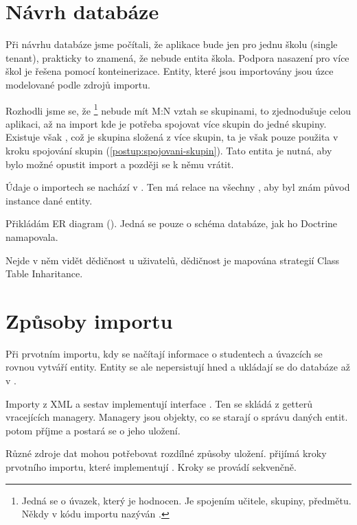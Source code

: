 \section{Návrh databáze}

Při návrhu databáze jsme počítali, že aplikace bude jen pro jednu školu (single tenant), prakticky to znamená, že nebude entita škola. 
Podpora nasazení pro více škol je řešena pomocí konteinerizace.
Entity, které jsou importovány jsou úzce modelované podle zdrojů importu.

Rozhodli jsme se, že \footnote{Jedná se o úvazek, který je hodnocen. Je spojením učitele, skupiny, předmětu. Někdy v kódu importu nazýván .} 
nebude mít M:N vztah se skupinami, to zjednodušuje celou aplikaci, až na import kde je potřeba spojovat více skupin do jedné skupiny.
Existuje však , což je skupina složená z více skupin, ta je však pouze použita v kroku spojování skupin (\ref{postup:spojovani-skupin}).
Tato entita je nutná, aby bylo možné opustit import a později se k němu vrátit.

Údaje o importech se nachází v . Ten má relace na všechny , aby byl znám původ instance dané entity.

Přikládám ER diagram (). Jedná se pouze o schéma databáze, jak ho Doctrine namapovala.

Nejde v něm vidět dědičnost u uživatelů, dědičnost je mapována strategií Class Table Inharitance\cite{P-of-EAA}.






\section{Způsoby importu}
Při prvotním importu, kdy se načítají informace o studentech a úvazcích se rovnou vytváří entity. Entity se ale nepersistují hned a ukládají se do databáze až v .

Importy z XML a sestav implementují interface . Ten se skládá z getterů vracejících managery. Managery jsou objekty, co se starají o správu daných entit.  potom příjme  a postará se o jeho uložení. 

Různé zdroje dat mohou potřebovat rozdílné způsoby uložení.  přijímá kroky prvotního importu, které implementují . Kroky se provádí sekvenčně.

